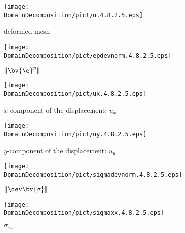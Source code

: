 \begin{figure}[h!]
   \begin{minipage}{7cm}
   \begin{center}
\vspace*{0mm}
     \texttt{[image: \\DomainDecomposition/pict/u.4.8.2.5.eps]}
\caption{ \label{fig:net} deformed mesh}
   \end{center}
   \end{minipage}
  \hspace*{10mm}
   \begin{minipage}{7cm}
   \begin{center}
     \texttt{[image: \\DomainDecomposition/pict/epdevnorm.4.8.2.5.eps]}
\caption{ \label{fig:ep} $\|\bv{\e}^p\|$ }
   \end{center}
   \end{minipage}

   \begin{minipage}{7cm}
   \begin{center}
     \texttt{[image: \\DomainDecomposition/pict/ux.4.8.2.5.eps]}
\caption{ \label{fig:ux} $x$-component of the displacement: $u_x$}
   \end{center}
   \end{minipage}
  \hspace*{10mm}
   \begin{minipage}{7cm}
   \begin{center}
     \texttt{[image: \\DomainDecomposition/pict/uy.4.8.2.5.eps]}
\caption{ \label{fig:uy} $y$-component of the displacement: $u_y$ }
   \end{center}
   \end{minipage}

   \begin{minipage}{7cm}
   \begin{center}
     \texttt{[image: \\DomainDecomposition/pict/sigmadevnorm.4.8.2.5.eps]}
\caption{ \label{fig:sigmadev} $\|\dev \bv{\sigma}\|$}
   \end{center}
   \end{minipage}
  \hspace*{10mm}
   \begin{minipage}{7cm}
   \begin{center}
     \texttt{[image: \\DomainDecomposition/pict/sigmaxx.4.8.2.5.eps]}
\caption{ \label{fig:sigmaxx} $\sigma_{xx}$}
   \end{center}
   \end{minipage}


\end{figure}
